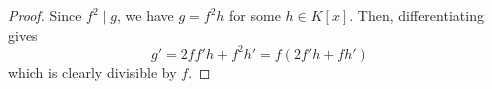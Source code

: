 \begin{proof}
    Since $f^2 \mid g$, we have $g = f^2h$ for some $h \in K[x]$. Then, differentiating gives
    \[ g' = 2ff'h + f^2h' = f(2f'h+fh') \]
    which is clearly divisible by $f$.
\end{proof}
